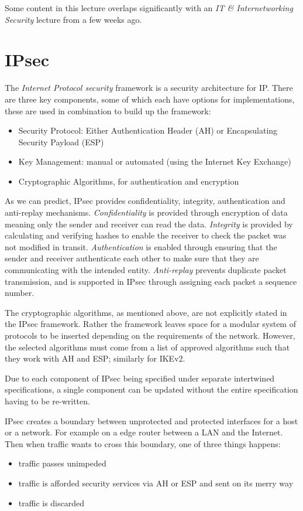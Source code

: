 
Some content in this lecture overlaps significantly with an \textit{IT \& Internetworking Security} lecture from a few weeks ago.

\section{IPsec}
The \textit{Internet Protocol security} framework is a security architecture for IP. There are three key components, some of which each have options for implementations, these are used in combination to build up the framework:
\begin{itemize}
    \item Security Protocol: Either Authentication Header (AH) or Encapsulating Security Payload (ESP)
    \item Key Management: manual or automated (using the Internet Key Exchange)
    \item Cryptographic Algorithms, for authentication and encryption
\end{itemize}

As we can predict, IPsec provides confidentiality, integrity, authentication and anti-replay mechanisms. \textit{Confidentiality} is provided through encryption of data meaning only the sender and receiver can read the data. \textit{Integrity} is provided by calculating and verifying hashes to enable the receiver to check the packet was not modified in transit. \textit{Authentication} is enabled through ensuring that the sender and receiver authenticate each other to make sure that they are communicating with the intended entity. \textit{Anti-replay} prevents duplicate packet transmission, and is supported in IPsec through assigning each packet a sequence number. 

The cryptographic algorithms, as mentioned above, are not explicitly stated in the IPsec framework. Rather the framework leaves space for a modular system of protocols to be inserted depending on the requirements of the network. However, the selected algorithms must come from a list of approved algorithms such that they work with AH and ESP; similarly for IKEv2.

Due to each component of IPsec being specified under separate intertwined specifications, a single component can be updated without the entire specification having to be re-written.

IPsec creates a boundary between unprotected and protected interfaces for a host or a network. For example on a edge router between a LAN and the Internet.  Then when traffic wants to cross this boundary, one of three things happens:
\begin{itemize}
    \item traffic passes unimpeded
    \item traffic is afforded security services via AH or ESP and sent on its merry way
    \item traffic is discarded
\end{itemize}

